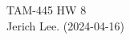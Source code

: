\documentclass[12pt]{article}
\begin{document}
\noindent TAM-445 \hfill HW 8\\
Jerich Lee. (2024-04-16)

\hrulefill




\end{document}
